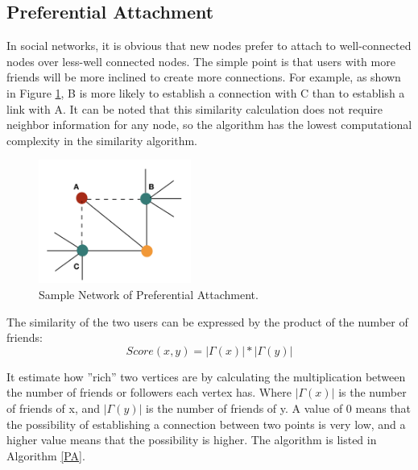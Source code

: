\documentclass{article}
\begin{document}
\subsection{Preferential Attachment}
In social networks, it is obvious that new nodes prefer to attach to well-connected nodes over less-well connected nodes. The simple point is that users with more friends will be more inclined to create more connections. For example, as shown in Figure \ref{PA_NW}, B is more likely to establish a connection with C than to establish a link with A. It can be noted that this similarity calculation does not require neighbor information for any node, so the algorithm has the lowest computational complexity in the similarity algorithm. \\

\begin{figure}[h!]
	\includegraphics[width=5cm]{images/pa_nw.png}
	\centering
	\caption{Sample Network of Preferential Attachment.}	\label{PA_NW}
\end{figure}

The similarity of the two users can be expressed by the product of the number of friends:
\begin{equation}
Score(x,y) = |\Gamma (x)|*| \Gamma (y)|
\end{equation}

It estimate how  ”rich”  two vertices are by calculating the multiplication between the number of friends or followers each vertex has. Where $|\Gamma(x)|$ is the number of friends of x, and $|\Gamma(y)|$ is the number of friends of y. A value of 0 means that the possibility of establishing a connection between two points is very low, and a higher value means that the possibility is higher. The algorithm is listed in Algorithm \ref{PA}.
\end{document}
